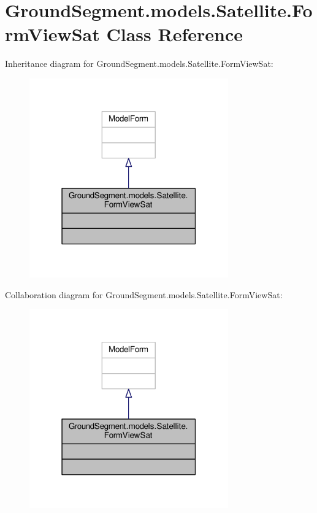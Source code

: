 \hypertarget{class_ground_segment_1_1models_1_1_satellite_1_1_form_view_sat}{}\section{Ground\+Segment.\+models.\+Satellite.\+Form\+View\+Sat Class Reference}
\label{class_ground_segment_1_1models_1_1_satellite_1_1_form_view_sat}


Inheritance diagram for Ground\+Segment.\+models.\+Satellite.\+Form\+View\+Sat\+:\nopagebreak
\begin{figure}[H]
\begin{center}
\leavevmode
\includegraphics[width=243pt]{class_ground_segment_1_1models_1_1_satellite_1_1_form_view_sat__inherit__graph}
\end{center}
\end{figure}


Collaboration diagram for Ground\+Segment.\+models.\+Satellite.\+Form\+View\+Sat\+:\nopagebreak
\begin{figure}[H]
\begin{center}
\leavevmode
\includegraphics[width=243pt]{class_ground_segment_1_1models_1_1_satellite_1_1_form_view_sat__coll__graph}
\end{center}
\end{figure}
